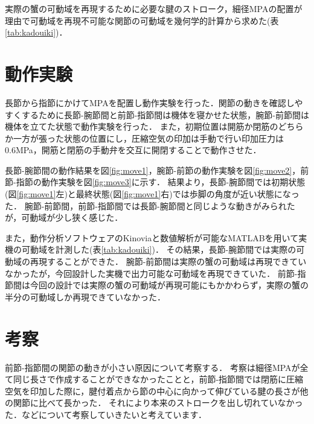 \documentclass{jarticle}
\begin{document}
実際の蟹の可動域を再現するために必要な腱のストローク，細径MPAの配置が理由で可動域を再現不可能な関節の可動域を幾何学的計算から求めた(表\ref{tab:kadouiki})．
\vspace*{-2mm}
\section{動作実験}

長節から指節にかけてMPAを配置し動作実験を行った．関節の動きを確認しやすくするために長節-腕節間と前節-指節間は機体を寝かせた状態，腕節-前節間は機体を立てた状態で動作実験を行った．
また，初期位置は開筋か閉筋のどちらか一方が張った状態の位置にし，圧縮空気の印加は手動で行い印加圧力は0.6MPa，開筋と閉筋の手動弁を交互に開閉することで動作させた．

長節-腕節間の動作結果を図\ref{fig:move1}，腕節-前節の動作実験を図\ref{fig:move2}，前節-指節の動作実験を図\ref{fig:move3}に示す．
結果より，長節-腕節間では初期状態(図\ref{fig:move1}左)と最終状態(図\ref{fig:move1}右)では歩脚の角度が近い状態になった．
腕節-前節間，前節-指節間では長節-腕節間と同じような動きがみられたが，可動域が少し狭く感じた．

また，動作分析ソフトウェアのKinoviaと数値解析が可能なMATLABを用いて実機の可動域を計測した(表\ref{tab:kadouiki})．
その結果，長節-腕節間では実際の可動域の再現することができた．
腕節-前節間は実際の蟹の可動域は再現できていなかったが，今回設計した実機で出力可能な可動域を再現できていた．
前節-指節間は今回の設計では実際の蟹の可動域が再現可能にもかかわらず，実際の蟹の半分の可動域しか再現できていなかった．
\vspace*{-2mm}
\section{考察}

前節-指節間の関節の動きが小さい原因について考察する．
考察は細径MPAが全て同じ長さで作成することができなかったことと，前節-指節間では閉筋に圧縮空気を印加した際に，腱付着点から節の中心に向かって伸びている腱の長さが他の関節に比べて長かった．
それにより本来のストロークを出し切れていなかった．などについて考察していきたいと考えています．
\end{document}
